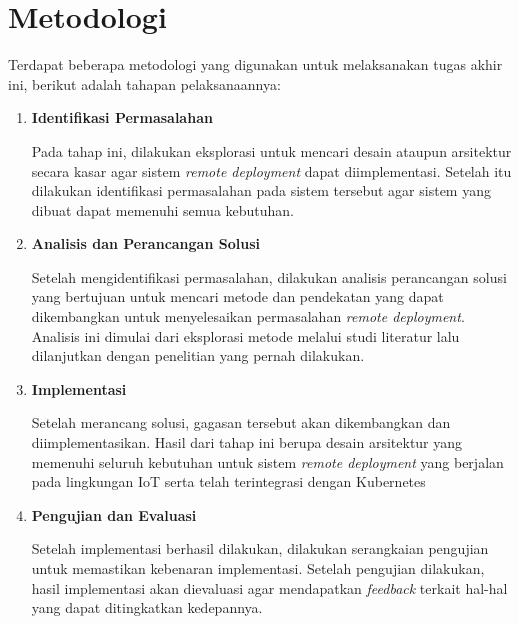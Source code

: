 \section{Metodologi}

Terdapat beberapa metodologi yang digunakan untuk melaksanakan tugas akhir ini, berikut adalah tahapan pelaksanaannya:
\begin{enumerate}
  \item \textbf{Identifikasi Permasalahan}

        Pada tahap ini, dilakukan eksplorasi untuk mencari desain ataupun arsitektur secara kasar agar sistem \textit{remote deployment} dapat diimplementasi. Setelah itu dilakukan identifikasi permasalahan pada sistem tersebut agar sistem yang dibuat dapat memenuhi semua kebutuhan.

  \item \textbf{Analisis dan Perancangan Solusi}

        Setelah mengidentifikasi permasalahan, dilakukan analisis perancangan solusi yang bertujuan untuk mencari metode dan pendekatan yang dapat dikembangkan untuk menyelesaikan permasalahan \textit{remote deployment}. Analisis ini dimulai dari eksplorasi metode melalui studi literatur lalu dilanjutkan dengan penelitian yang pernah dilakukan.

  \item \textbf{Implementasi}

        Setelah merancang solusi, gagasan tersebut akan dikembangkan dan diimplementasikan. Hasil dari tahap ini berupa desain arsitektur yang memenuhi seluruh kebutuhan untuk sistem \textit{remote deployment} yang berjalan pada lingkungan IoT serta telah terintegrasi dengan Kubernetes

  \item \textbf{Pengujian dan Evaluasi}

        Setelah implementasi berhasil dilakukan, dilakukan serangkaian pengujian untuk memastikan kebenaran implementasi. Setelah pengujian dilakukan, hasil implementasi akan dievaluasi agar mendapatkan \textit{feedback} terkait hal-hal yang dapat ditingkatkan kedepannya.

\end{enumerate}